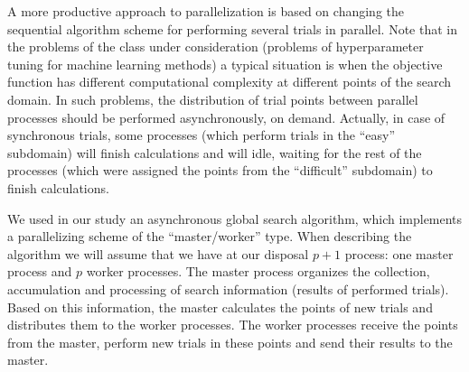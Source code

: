\documentclass[runningheads]{llncs}
\begin{document}
A more productive approach to parallelization is based on changing the sequential algorithm scheme for performing several trials in parallel. Note that in the problems of the class under consideration (problems of hyperparameter tuning for machine learning methods) a typical situation is when the objective function has different computational complexity at different points of the search domain. In such problems, the distribution of trial points between parallel processes should be performed asynchronously, on demand. Actually, in case of synchronous trials, some processes (which perform trials in the ``easy'' subdomain) will finish calculations and will idle, waiting for the rest of the processes (which were assigned the points from the ``difficult'' subdomain) to finish calculations.

We used in our study an asynchronous global search algorithm, which implements a parallelizing scheme of the ``master/worker'' type. When describing the algorithm we will assume that we have at our disposal $p+1$ process: one master process and $p$ worker processes. The master process organizes the collection, accumulation and processing of search information (results of performed trials). Based on this information, the master calculates the points of new trials and distributes them to the worker processes. The worker processes receive the points from the master, perform new trials in these points and send their results to the master.
\end{document}
